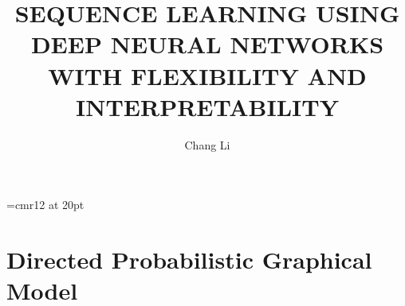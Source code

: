 \documentclass{StyFiles/usydthesis}
\renewcommand{\thepage}{\roman{page}}
\begin{document}
\singlespacing
{}  %
\renewcommand{\thepage}{\roman{page}}	
\font\myfont=cmr12 at 20pt 
\title{{\myfont\bf SEQUENCE LEARNING USING DEEP NEURAL NETWORKS WITH FLEXIBILITY AND INTERPRETABILITY}}
\author{Chang Li}
\def\thisauthor{Chang Li}
\def\degree{Doctor of Philosophy}
\def\department{School of Computer Science \\ Faculty of Engineering}
\def\mydegrees{Doctor of Philosophy (Ph.D.)}
\def\supervisor{Dacheng Tao}
\def\assocsupervisora{Dongjin Song}

\onehalfspacing
% 

% 

% 

% 

\cleardoublepage
\pagestyle{headings}
\tableofcontents
\listoffigures
\listoftables

\setcounter{page}{1}  %



\mainmatter


\part{Directed Probabilistic Graphical Model}
\label{part:1}


\end{document}
